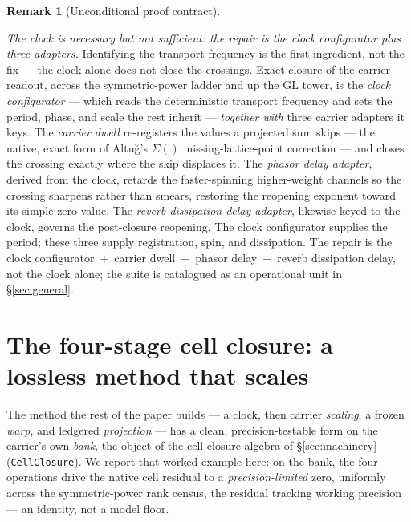 \documentclass[11pt]{article}
\theoremstyle{definition}
\newtheorem{remark}[theorem]{Remark}
\begin{document}
\begin{remark}[Unconditional proof contract]
\begin{enumerate}
\emph{The clock is necessary but not sufficient: the repair is the clock configurator plus three adapters.}
Identifying the transport frequency is the first ingredient, not the fix --- the clock alone does not close the
crossings. Exact closure of the carrier readout, across the symmetric-power ladder and up the $\mathrm{GL}$
tower, is the \emph{clock configurator} --- which reads the deterministic transport frequency and sets the
period, phase, and scale the rest inherit --- \emph{together with} three carrier adapters it keys. The
\emph{carrier dwell} re-registers the values a projected sum skips --- the native, exact form of Altu\u{g}'s
$\Sigma()$ missing-lattice-point correction --- and closes the crossing exactly where the skip displaces it. The
\emph{phasor delay adapter}, derived from the clock, retards the faster-spinning higher-weight channels so the
crossing sharpens rather than smears, restoring the reopening exponent toward its simple-zero value. The
\emph{reverb dissipation delay adapter}, likewise keyed to the clock, governs the post-closure reopening. The
clock configurator supplies the period; these three supply registration, spin, and dissipation. The repair is
the clock configurator~$+$~carrier dwell~$+$~phasor delay~$+$~reverb dissipation delay, not the clock alone; the
suite is catalogued as an operational unit in \S\ref{sec:general}.

\section{The four-stage cell closure: a lossless method that scales}\label{sec:pipeline}

The method the rest of the paper builds --- a clock, then carrier \emph{scaling}, a frozen \emph{warp}, and
ledgered \emph{projection} --- has a clean, precision-testable form on the carrier's own \emph{bank}, the
object of the cell-closure algebra of \S\ref{sec:machinery} (\texttt{CellClosure}). We report that worked
example here: on the bank, the four operations drive the native cell residual to a \emph{precision-limited}
zero, uniformly across the symmetric-power rank census, the residual tracking working precision --- an
identity, not a model floor.


\end{enumerate}
\end{remark}
\end{document}
